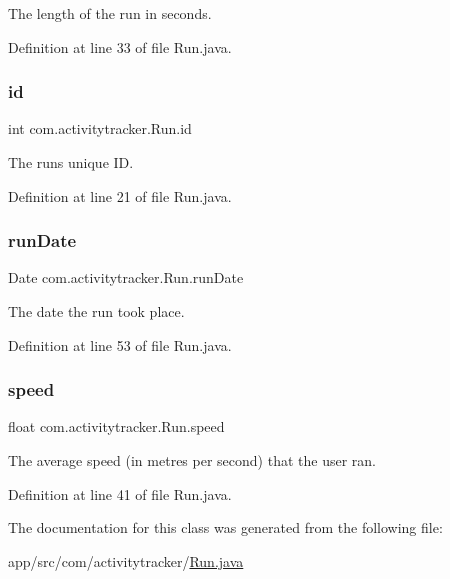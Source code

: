The length of the run in seconds. 

Definition at line 33 of file Run.\+java.

\mbox{\label{classcom_1_1activitytracker_1_1_run_aa76717aee690b5bfe919d6e87dea1d84}} 
\subsubsection{\texorpdfstring{id}{id}}
{\footnotesize\ttfamily int com.\+activitytracker.\+Run.\+id\hspace{0.3cm}{\ttfamily [package]}}

The run\textquotesingle{}s unique ID. 

Definition at line 21 of file Run.\+java.

\mbox{\label{classcom_1_1activitytracker_1_1_run_a2f519da043ea384f1ba0d156f4971367}} 
\subsubsection{\texorpdfstring{run\+Date}{runDate}}
{\footnotesize\ttfamily Date com.\+activitytracker.\+Run.\+run\+Date\hspace{0.3cm}{\ttfamily [package]}}

The date the run took place. 

Definition at line 53 of file Run.\+java.

\mbox{\label{classcom_1_1activitytracker_1_1_run_ada0c6e189d55997133cde5bbe9913984}} 
\subsubsection{\texorpdfstring{speed}{speed}}
{\footnotesize\ttfamily float com.\+activitytracker.\+Run.\+speed\hspace{0.3cm}{\ttfamily [package]}}

The average speed (in metres per second) that the user ran. 

Definition at line 41 of file Run.\+java.



The documentation for this class was generated from the following file\+:\begin{DoxyCompactItemize}
\item 
app/src/com/activitytracker/\mbox{\hyperlink{_run_8java}{Run.\+java}}\end{DoxyCompactItemize}
